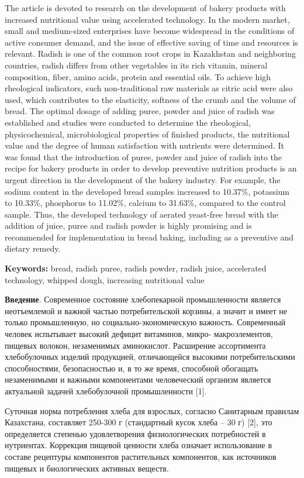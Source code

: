 The article is devoted to research on the development of bakery products
with increased nutritional value using accelerated technology. In the
modern market, small and medium-sized enterprises have become widespread
in the conditions of active consumer demand, and the issue of effective
saving of time and resources is relevant. Radish is one of the common
root crops in Kazakhstan and neighboring countries, radish differs from
other vegetables in its rich vitamin, mineral composition, fiber, amino
acids, protein and essential oils. To achieve high rheological
indicators, such non-traditional raw materials as citric acid were also
used, which contributes to the elasticity, softness of the crumb and the
volume of bread. The optimal dosage of adding puree, powder and juice of
radish was established and studies were conducted to determine the
rheological, physicochemical, microbiological properties of finished
products, the nutritional value and the degree of human satisfaction
with nutrients were determined. It was found that the introduction of
puree, powder and juice of radish into the recipe for bakery products in
order to develop preventive nutrition products is an urgent direction in
the development of the bakery industry. For example, the sodium content
in the developed bread samples increased to 10.37\%, potassium to
10.33\%, phosphorus to 11.02\%, calcium to 31.63\%, compared to the
control sample. Thus, the developed technology of aerated yeast-free
bread with the addition of juice, puree and radish powder is highly
promising and is recommended for implementation in bread baking,
including as a preventive and dietary remedy.

{\bfseries Keywords:} bread, radish puree, radish powder, radish juice,
accelerated technology, whipped dough, increasing nutritional value

{\bfseries Введение}. Современное состояние хлебопекарной промышленности
является неотъемлемой и важной частью потребительской корзины, а значит
и имеет не только промышленную, но социально-экономическую важность.
Современный человек испытывает высокий дефицит витаминов, микро-
макроэлементов, пищевых волокон, незаменимых аминокислот. Расширение
ассортимента хлебобулочных изделий продукцией, отличающейся высокими
потребительскими способностями, безопасностью и, в то же время,
способной обогащать незаменимыми и важными компонентами человеческий
организм является актуальной задачей хлебобулочной промышленности
{[}1{]}.

Суточная норма потребления хлеба для взрослых, согласно Санитарным
правилам Казахстана, составляет 250-300 г (стандартный кусок хлеба -- 30
г) {[}2{]}, это определяется степенью удовлетворения физиологических
потребностей в нутриентах. Коррекция пищевой ценности хлеба означает
использование в составе рецептуры компонентов растительных компонентов,
как источников пищевых и биологических активных веществ.

